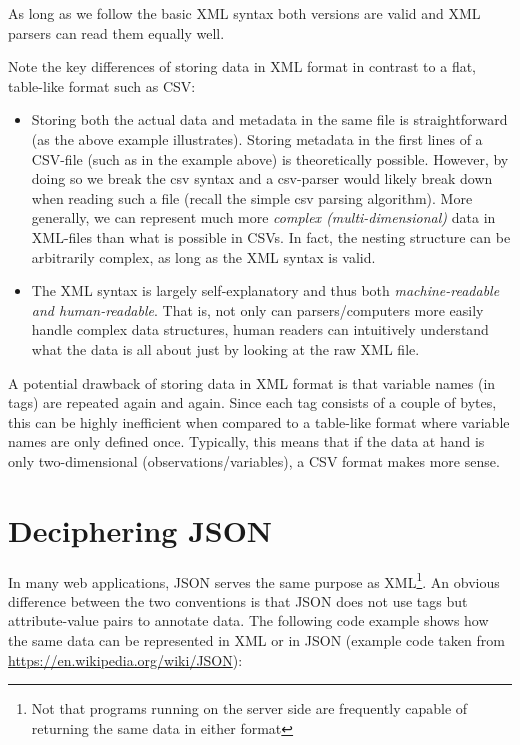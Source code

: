 \documentclass[
  12pt,
]{style/krantz}
\providecommand{\tightlist}{%
  \setlength{\itemsep}{0pt}\setlength{\parskip}{0pt}}
\begin{document}
As long as we follow the basic XML syntax both versions are valid and XML parsers can read them equally well.

Note the key differences of storing data in XML format in contrast to a flat, table-like format such as CSV:

\begin{itemize}
\tightlist
\item
  Storing both the actual data and metadata in the same file is straightforward (as the above example illustrates). Storing metadata in the first lines of a CSV-file (such as in the example above) is theoretically possible. However, by doing so we break the csv syntax and a csv-parser would likely break down when reading such a file (recall the simple csv parsing algorithm). More generally, we can represent much more \emph{complex (multi-dimensional)} data in XML-files than what is possible in CSVs. In fact, the nesting structure can be arbitrarily complex, as long as the XML syntax is valid.
\item
  The XML syntax is largely self-explanatory and thus both \emph{machine-readable and human-readable}. That is, not only can parsers/computers more easily handle complex data structures, human readers can intuitively understand what the data is all about just by looking at the raw XML file.
\end{itemize}

A potential drawback of storing data in XML format is that variable names (in tags) are repeated again and again. Since each tag consists of a couple of bytes, this can be highly inefficient when compared to a table-like format where variable names are only defined once. Typically, this means that if the data at hand is only two-dimensional (observations/variables), a CSV format makes more sense.

\hypertarget{deciphering-json}{%
\section{Deciphering JSON}\label{deciphering-json}}

In many web applications, JSON serves the same purpose as XML\footnote{Not that programs running on the server side are frequently capable of returning the same data in either format}. An obvious difference between the two conventions is that JSON does not use tags but attribute-value pairs to annotate data. The following code example shows how the same data can be represented in XML or in JSON (example code taken from \url{https://en.wikipedia.org/wiki/JSON}):
\end{document}
